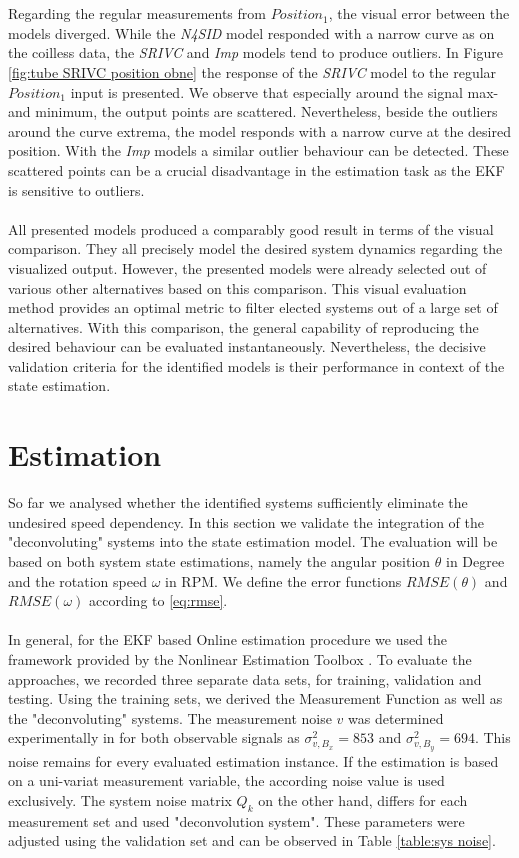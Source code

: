 \documentclass[english]{isasthesis}
\begin{document}
  		\\\\Regarding the regular measurements from $Position_1$, the visual error between the models diverged. While the \textit{N4SID} model responded with a narrow curve as on the coilless data, the \textit{SRIVC} and \textit{Imp} models tend to produce outliers. In Figure \ref{fig:tube SRIVC position obne} the response of the \textit{SRIVC} model to the regular $Position_1$ input is presented. We observe that especially around the signal max- and minimum, the output points are scattered. Nevertheless, beside the outliers around the curve extrema, the model responds with a narrow curve at the desired position. With the \textit{Imp} models a similar outlier behaviour can be detected. These scattered points can be a crucial disadvantage in the estimation task as the EKF is sensitive to outliers.\\\\
  		All presented models produced a comparably good result in terms of the visual comparison. They all precisely model the desired system dynamics regarding the visualized output. However, the presented models were already selected out of various other alternatives based on this comparison. This visual evaluation method provides an optimal metric to filter elected systems out of a large set of alternatives. With this comparison, the general capability of reproducing the desired behaviour can be evaluated instantaneously. Nevertheless, the decisive validation criteria for the identified models is their performance in context of the state estimation.
  		\section{Estimation}
  		So far we analysed whether the identified systems sufficiently eliminate the undesired speed dependency. In this section we validate the integration of the "deconvoluting" systems into the state estimation model. The evaluation will be based on both system state estimations, namely the angular position $\theta$ in Degree and the rotation speed $\omega$ in RPM. We define the error functions $RMSE(\theta)$ and $RMSE(\omega)$ according to \eqref{eq:rmse}. \\\\
  		In general, for the EKF based Online estimation procedure we used the framework provided by the Nonlinear Estimation Toolbox \cite{nonlinearestimationtoolbox}. To evaluate the approaches, we recorded three separate data sets, for training, validation and testing. Using the training sets, we derived the Measurement Function as well as the "deconvoluting" systems.     The measurement noise $v$ was determined experimentally in \citep{basarurposition} for both observable signals as $\sigma^2_{v,B_x} = 853$ and  $\sigma^2_{v,B_y} = 694$. This noise remains for every evaluated estimation instance. If the estimation is based on a uni-variat measurement variable, the according noise value is used exclusively. The system noise matrix $Q_k$ on the other hand, differs for each measurement set and used "deconvolution system". These parameters were adjusted using the validation set and can be observed in Table \ref{table:sys noise}. 
\end{document}
